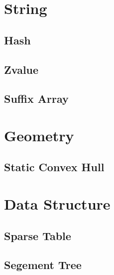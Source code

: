 \section{String}
\subsection{Hash} 

\subsection{Zvalue} 

\subsection{Suffix Array} 


\section{Geometry}
\subsection{Static Convex Hull} 


\section{Data Structure}
\subsection{Sparse Table}

\subsection{Segement Tree}
